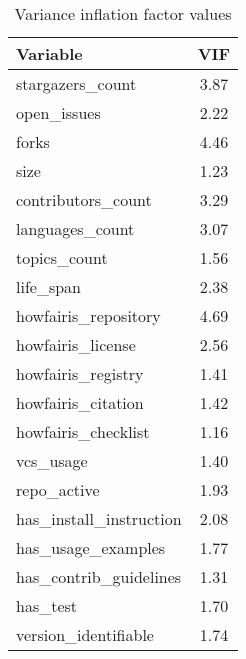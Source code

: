 \begin{table}
\centering
\caption{Variance inflation factor values}
\label{tab:vif}
\begin{tabular}{lc}
\toprule
               Variable &  VIF \\
\midrule
       stargazers\_count & 3.87 \\
            open\_issues & 2.22 \\
                  forks & 4.46 \\
                   size & 1.23 \\
     contributors\_count & 3.29 \\
        languages\_count & 3.07 \\
           topics\_count & 1.56 \\
              life\_span & 2.38 \\
   howfairis\_repository & 4.69 \\
      howfairis\_license & 2.56 \\
     howfairis\_registry & 1.41 \\
     howfairis\_citation & 1.42 \\
    howfairis\_checklist & 1.16 \\
              vcs\_usage & 1.40 \\
            repo\_active & 1.93 \\
has\_install\_instruction & 2.08 \\
     has\_usage\_examples & 1.77 \\
 has\_contrib\_guidelines & 1.31 \\
               has\_test & 1.70 \\
   version\_identifiable & 1.74 \\
\bottomrule
\end{tabular}
\end{table}
